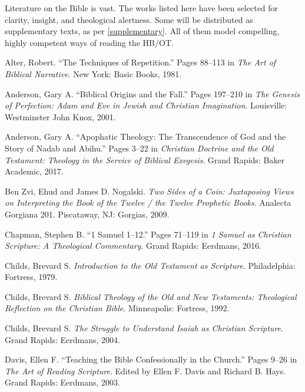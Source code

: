 \documentclass[titlepage]{article}
\begin{document}
Literature on the Bible is vast. The works listed here have been
selected for clarity, insight, and theological alertness. Some will be
distributed as supplementary texts, as per \autoref{supplementary}. All
of them model compelling, highly competent ways of reading the HB/OT.

\begingroup
\renewcommand{\section}[2]{}%
\begin{thebibliography}{99}

 Alter, Robert. “The Techniques of Repetition.” Pages 88–113 in \emph{The Art of Biblical Narrative}. New York: Basic Books, 1981.

 Anderson, Gary A. “Biblical Origins and the Fall.” Pages 197–210 in \emph{The Genesis of Perfection: Adam and Eve in Jewish and Christian Imagination}. Louisville: Westminster John Knox, 2001.

 Anderson, Gary A. “Apophatic Theology: The Transcendence of God and the Story of Nadab and Abihu.” Pages 3–22 in \emph{Christian Doctrine and the Old Testament: Theology in the Service of Biblical Exegesis}. Grand Rapids: Baker Academic, 2017.

 Ben Zvi, Ehud and James D. Nogalski. \emph{Two Sides of a Coin: Juxtaposing Views on Interpreting the Book of the Twelve / the Twelve Prophetic Books}. Analecta Gorgiana 201. Piscataway, NJ: Gorgias, 2009.

 Chapman, Stephen B. “1 Samuel 1–12.” Pages 71–119 in \emph{1 Samuel as Christian Scripture: A Theological Commentary}. Grand Rapids: Eerdmans, 2016.

 Childs, Brevard S. \emph{Introduction to the Old Testament as Scripture}. Philadelphia: Fortress, 1979.

 Childs, Brevard S. \emph{Biblical Theology of the Old and New Testaments: Theological Reflection on the Christian Bible}. Minneapolis: Fortress, 1992.

 Childs, Brevard S. \emph{The Struggle to Understand Isaiah as Christian Scripture}. Grand Rapids: Eerdmans, 2004.

 Davis, Ellen F. “Teaching the Bible Confessionally in the Church.” Pages 9–26 in \emph{The Art of Reading Scripture}. Edited by Ellen F. Davis and Richard B. Hays. Grand Rapids: Eerdmans, 2003.


\end{thebibliography}
\end{document}
